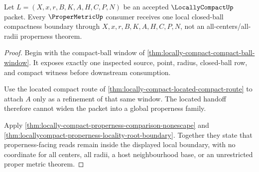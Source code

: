 \begin{theorem}\label{thm:locally-compact-proper-metric-nonescape}
Let $L=(X,x,r,B,K,A,H,C,P,N)$ be an accepted $\LocallyCompactUp$ packet. Every $\ProperMetricUp$ consumer receives one local closed-ball compactness boundary through $X,x,r,B,K,A,H,C,P,N$, not an all-centers/all-radii properness theorem.
\end{theorem}
\begin{proof}
Begin with the compact-ball window of \autoref{thm:locally-compact-compact-ball-window}. It exposes exactly one inspected source, point, radius, closed-ball row, and compact witness before downstream consumption.

Use the located compact route of \autoref{thm:locally-compact-located-compact-route} to attach $A$ only as a refinement of that same window. The located handoff therefore cannot widen the packet into a global properness family.

Apply \autoref{thm:locally-compact-properness-comparison-nonescape} and \autoref{thm:locallycompact-properness-locality-root-boundary}. Together they state that properness-facing reads remain inside the displayed local boundary, with no coordinate for all centers, all radii, a host neighbourhood base, or an unrestricted proper metric theorem.
\end{proof}


